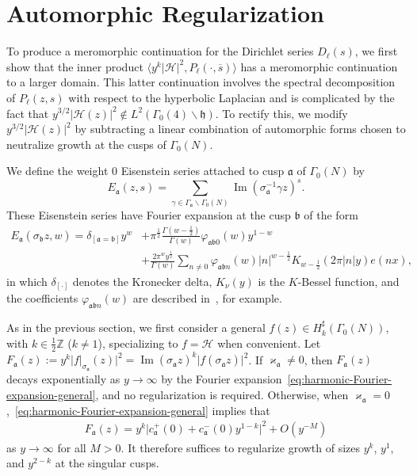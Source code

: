 \documentclass[11pt,reqno]{amsart}
\theoremstyle{plain}
\theoremstyle{definition}
\numberwithin{equation}{section}
\renewcommand{\Im}{\operatorname{Im}}
\begin{document}

\section{Automorphic Regularization} \label{sec:automorphic-regularization}

To produce a meromorphic continuation for the Dirichlet series $D_\ell(s)$, we first show that the inner product $\langle y^k \vert \mathcal{H} \vert^2, P_\ell(\cdot, \overline{s}) \rangle$ has a meromorphic continuation to a larger domain. This latter continuation involves the spectral decomposition of $P_\ell(z,s)$ with respect to the hyperbolic Laplacian and is complicated by the fact that $y^{3/2} \vert \mathcal{H}(z) \vert^2 \notin L^2(\Gamma_0(4) \backslash \mathfrak{h})$. To rectify this, we modify $y^{3/2} \vert \mathcal{H}(z) \vert^2$ by subtracting a linear combination of automorphic forms chosen to neutralize growth at the cusps of $\Gamma_0(N)$.

We define the weight $0$ Eisenstein series attached to cusp $\mathfrak{a}$ of $\Gamma_0(N)$ by
\[
	E_\mathfrak{a}(z,s) = \sum_{\gamma \in \Gamma_\mathfrak{a} \backslash \Gamma_0(N)}
		\Im(\sigma_\mathfrak{a}^{-1}\gamma z)^s.
\]
These Eisenstein series have Fourier expansion at the cusp $\mathfrak{b}$ of the form
\begin{align} \label{eq:Fourier-Eisenstein}
	E_\mathfrak{a}(\sigma_\mathfrak{b} z,w) 
		= \delta_{[\mathfrak{a}=\mathfrak{b}]} y^w 
			&+ \pi^\frac{1}{2} \frac{\Gamma(w-\frac{1}{2})}{\Gamma(w)} \varphi_{\mathfrak{ab}0}(w) y^{1-w} \\
		&+ \frac{2\pi^w y^\frac{1}{2}}{\Gamma(w)} 
		\sum_{n \neq 0} \varphi_{\mathfrak{ab}n}(w) \vert n \vert^{w-\frac{1}{2}} 
			K_{w-\frac{1}{2}}(2\pi \vert n \vert y) e(nx),
\end{align}
in which $\delta_{[\cdot]}$ denotes the Kronecker delta, $K_\nu(y)$ is the $K$-Bessel function, and the coefficients $\varphi_{\mathfrak{ab}n}(w)$ are described in~\cite{DeshouillersIwaniec82}, for example. 

As in the previous section, we first consider a general $f(z) \in H_k^\sharp(\Gamma_0(N))$, with $k \in \frac{1}{2} \mathbb{Z}$ ($k \neq 1$), specializing to $f = \mathcal{H}$ when convenient. Let $F_\mathfrak{a}(z) := y^k \vert f\vert_{\sigma_{\mathfrak{a}}}(z) \vert^2 = \Im(\sigma_{\mathfrak{a}} z)^k \vert f(\sigma_{\mathfrak{a}} z) \vert^2$. If $\varkappa_\mathfrak{a} \neq 0$, then $F_\mathfrak{a}(z)$ decays exponentially as $y \to \infty$ by the Fourier expansion~\eqref{eq:harmonic-Fourier-expansion-general}, and no regularization is required. Otherwise, when $\varkappa_\mathfrak{a} = 0$,~\eqref{eq:harmonic-Fourier-expansion-general} implies that
\begin{align} \label{eq:F-growth}
	F_\mathfrak{a}(z) = y^k \vert c_\mathfrak{a}^+(0) + c_\mathfrak{a}^-(0) y^{1-k} \vert^2 + O(y^{-M})
\end{align}
as $y \to \infty$ for all $M> 0$. It therefore suffices to regularize growth of sizes $y^k$, $y^1$, and $y^{2-k}$ at the singular cusps.
\end{document}
